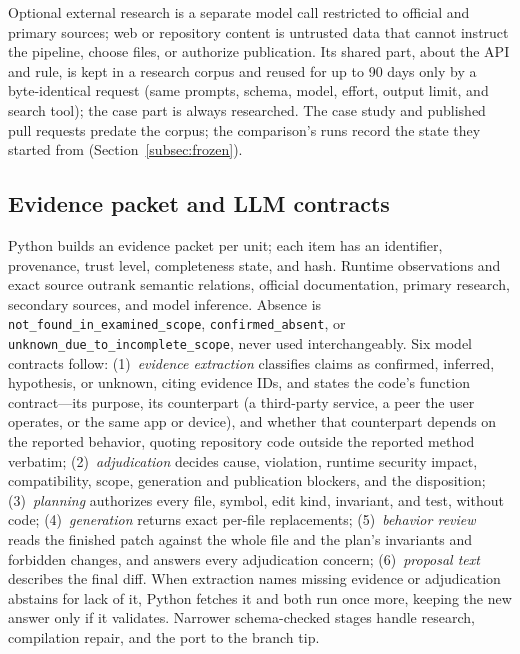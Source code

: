 \documentclass[conference]{IEEEtran}
\begin{document}
Optional external research is a separate model call restricted to official and
primary sources; web or repository content is untrusted data that cannot
instruct the pipeline, choose files, or authorize publication. Its shared part,
about the API and rule, is kept in a research corpus and reused for up to 90
days only by a byte-identical request (same prompts, schema, model, effort,
output limit, and search tool); the case part is always researched. The case
study and published pull requests predate the corpus; the comparison's runs
record the state they started from (Section~\ref{subsec:frozen}).

\subsection{Evidence packet and LLM contracts}

Python builds an evidence packet per unit; each item has an identifier,
provenance, trust level, completeness state, and hash. Runtime observations and
exact source outrank semantic relations, official documentation, primary
research, secondary sources, and model inference. Absence is
\texttt{not\_found\_in\_examined\_scope}, \texttt{confirmed\_absent}, or
\texttt{unknown\_due\_to\_}\allowbreak\texttt{incomplete\_scope}, never used
interchangeably. Six model contracts follow:
(1)~\emph{evidence extraction} classifies claims as confirmed, inferred,
hypothesis, or unknown, citing evidence IDs, and states the code's function
contract---its purpose, its counterpart (a third-party service, a peer the user
operates, or the same app or device), and whether that counterpart depends on
the reported behavior, quoting repository code outside the reported method
verbatim; (2)~\emph{adjudication} decides cause, violation, runtime security
impact, compatibility, scope, generation and publication blockers, and the
disposition; (3)~\emph{planning} authorizes every file, symbol, edit kind,
invariant, and test, without code; (4)~\emph{generation} returns exact
per-file replacements; (5)~\emph{behavior review} reads the finished patch
against the whole file and the plan's invariants and forbidden changes, and
answers every adjudication concern; (6)~\emph{proposal text} describes the
final diff. When extraction names missing evidence or adjudication abstains for
lack of it, Python fetches it and both run once more, keeping the new answer
only if it validates. Narrower schema-checked stages handle research,
compilation repair, and the port to the branch tip.
\end{document}
